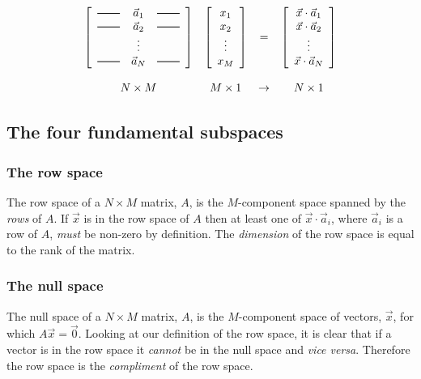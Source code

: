 \documentclass[a4paper]{article}
\newcommand{\hmatrixrule}{\rule[0.5ex]{2em}{0.7pt}}
\newcommand{\highlight}[1]{{\color{blue}#1}}
\begin{document}
\[
\begin{array}{cccc}
\left[
	\begin{array}{ccc}
		\hmatrixrule & \vec{a}_1 & \hmatrixrule \\
		\hmatrixrule & \vec{a}_2 & \hmatrixrule \\
		            & \vdots & \\
		\hmatrixrule & \vec{a}_N & \hmatrixrule
	\end{array}
\right] &
\left[
	\begin{array}{c}
		x_1 \\ x_2 \\ \vdots \\ x_M
	\end{array}
\right] &
= &
\left[
	\begin{array}{c}
		\vec{x} \cdot \vec{a}_1 \\ \vec{x} \cdot \vec{a}_2 \\ \vdots \\ \vec{x} \cdot \vec{a}_N
	\end{array}
\right]
\\
\rule{0pt}{2em} N \times M & M \times 1 & \rightarrow & N \times 1
\end{array}
\]

\subsection{The four fundamental subspaces}

\subsubsection{The row space}

The row space of a $N \times M$ matrix, $A$, is \highlight{the $M$-component space
spanned by the \emph{rows} of $A$}. If $\vec{x}$ is in the row space of $A$
then at least one of $\vec{x} \cdot \vec{a}_i$, where $\vec{a}_i$ is a row of
$A$, \emph{must} be non-zero by definition. \highlight{The \emph{dimension} of the row
space is equal to the rank of the matrix.}

\subsubsection{The null space}

The null space of a $N \times M$ matrix, $A$, is the \highlight{$M$-component} space of
vectors, $\vec{x}$, for which \highlight{$A\vec{x} = \vec{0}$}. Looking at our
definition of the row space, it is clear that if a vector is in the row space
it \emph{cannot} be in the null space and \emph{vice versa}. Therefore the row
space is the \emph{compliment} of the row space.
\end{document}
